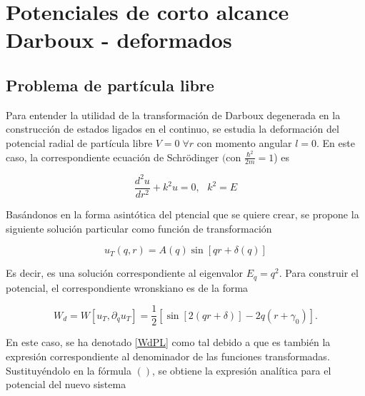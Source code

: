 



\chapter{Potenciales de corto alcance Darboux - deformados}

\section{Problema de partícula libre}

Para entender la utilidad de la transformación de Darboux degenerada en la construcción de estados ligados en el continuo, se estudia la deformación del potencial radial de partícula libre  $V=0 \; \forall r$ con momento angular $l=0$. En este caso, la correspondiente ecuación de Schrödinger $($con $ \frac{\hbar^2}{2m}=1$) es

\begin{equation*}
\frac{d^2 u}{dr^2} + k^2 u = 0,\,\,\,\, k^2 = E
\end{equation*}

Basándonos en la forma asintótica del ptencial que se quiere crear, se propone la siguiente solución particular como función de transformación

\begin{equation*}
u_T(q,r) = A(q) \sin[qr + \delta(q)]
\end{equation*}

Es decir, es una solución correspondiente al eigenvalor $E_q = q^2$. Para construir el potencial, el correspondiente wronskiano es de la forma

\begin{equation}
W_d = W[u_T,\partial_q u_T] =  \frac{1}{2}[\sin[2(qr+\delta)]-2q(r + \gamma_0)]. \label{WdPL}
\end{equation}

En este caso, se ha denotado \ref{WdPL} como tal debido a que es también la expresión correspondiente al denominador de las funciones transformadas. Sustituyéndolo en la fórmula $()$, se obtiene la expresión analítica para el potencial del nuevo sistema

